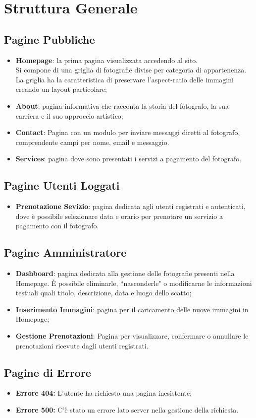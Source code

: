 \section{Struttura Generale}
\subsection{Pagine Pubbliche}
\begin{itemize}
    \item \textbf{Homepage}: la prima pagina visualizzata accedendo al sito.\\
    Si compone di una griglia di fotografie divise per categoria di appartenenza. La griglia ha la caratteristica di preservare l'aspect-ratio delle immagini creando un layout particolare;
    \item \textbf{About}: pagina informativa che racconta la storia del fotografo, la sua carriera e il suo approccio artistico;
    \item \textbf{Contact}: Pagina con un modulo per inviare messaggi diretti al fotografo, comprendente campi per nome, email e messaggio.
    \item \textbf{Services}: pagina dove sono presentati i servizi a pagamento del fotografo.
\end{itemize}

\subsection{Pagine Utenti Loggati}
\begin{itemize}
\item \textbf{Prenotazione Sevizio}: pagina dedicata agli utenti registrati e autenticati, dove \`e possibile selezionare data e orario per prenotare un servizio a pagamento con il fotografo.
\end{itemize}

\subsection{Pagine Amministratore}
\begin{itemize}
\item \textbf{Dashboard}: pagina dedicata alla gestione delle fotografie presenti nella Homepage. \`E possibile eliminarle, ``nasconderle" o modificarne le informazioni testuali quali titolo, descrizione, data e luogo dello scatto;
\item \textbf{Inserimento Immagini}: pagina per il caricamento delle nuove immagini in Homepage;
\item \textbf{Gestione Prenotazioni}: Pagina per visualizzare, confermare o annullare le prenotazioni ricevute dagli utenti registrati.
\end{itemize}

\subsection{Pagine di Errore}
\begin{itemize}
    \item \textbf{Errore 404:} L'utente ha richiesto una pagina inesistente;
    \item \textbf{Errore 500:} C'\`e stato un errore lato server nella gestione della richiesta.
\end{itemize}